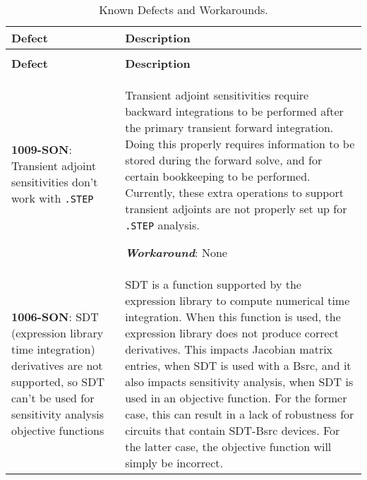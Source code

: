 




{
\small

\begin{longtable}[h] {>{\raggedright\small}m{2in}|>{\raggedright\let\\\tabularnewline\small}m{3.5in}}
  \caption{Known Defects and Workarounds.} \\ \hline
  \rowcolor{XyceDarkBlue} \color{white}\bf Defect & \color{white}\bf Description
  \\ \hline \endfirsthead
  \caption[]{Known Defects and Workarounds.} \\ \hline
  \rowcolor{XyceDarkBlue} \color{white}\bf Defect & \color{white}\bf Description
  \\ \hline \endhead

%
%
  \textbf{1009-SON}:  Transient adjoint sensitivities don't work with \texttt{.STEP}
  & Transient adjoint sensitivities require backward integrations to be performed after the primary transient forward integration.  Doing this properly requires information to be stored during the forward solve, and for certain bookkeeping to be performed.  Currently, these extra operations to support transient adjoints are not properly set up for \texttt{.STEP} analysis.

\textbf{\textit{Workaround}}: None
\\ \hline

  \textbf{1006-SON}:   SDT (expression library time integration) derivatives are not supported, so SDT can't be used for sensitivity analysis objective functions &
  SDT is a function supported by the \Xyce{} expression library to compute numerical time integration.  When this function is used, the expression library does not produce correct derivatives.  This impacts Jacobian matrix entries, when SDT is used with a Bsrc, and it also impacts sensitivity analysis, when SDT is used in an objective function.  For the former case, this can result in a lack of robustness for circuits that contain SDT-Bsrc devices.  For the latter case, the objective function will simply be incorrect.


\end{longtable}}
